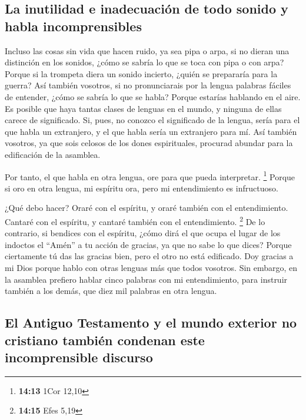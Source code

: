 \hypertarget{la-inutilidad-e-inadecuaciuxf3n-de-todo-sonido-y-habla-incomprensibles}{%
\subsection{La inutilidad e inadecuación de todo sonido y habla
incomprensibles}\label{la-inutilidad-e-inadecuaciuxf3n-de-todo-sonido-y-habla-incomprensibles}}

 Incluso las cosas sin vida que hacen ruido, ya sea pipa o
arpa, si no dieran una distinción en los sonidos, ¿cómo se sabría lo que
se toca con pipa o con arpa?  Porque si la trompeta diera
un sonido incierto, ¿quién se prepararía para la guerra? 
Así también vosotros, si no pronunciarais por la lengua palabras fáciles
de entender, ¿cómo se sabría lo que se habla? Porque estarías hablando
en el aire.  Es posible que haya tantas clases de lenguas
en el mundo, y ninguna de ellas carece de significado. 
Si, pues, no conozco el significado de la lengua, sería para el que
habla un extranjero, y el que habla sería un extranjero para mí.
 Así también vosotros, ya que sois celosos de los dones
espirituales, procurad abundar para la edificación de la asamblea.

 Por tanto, el que habla en otra lengua, ore para que
pueda interpretar. \footnote{\textbf{14:13} 1Cor 12,10} 
Porque si oro en otra lengua, mi espíritu ora, pero mi entendimiento es
infructuoso.

 ¿Qué debo hacer? Oraré con el espíritu, y oraré también
con el entendimiento. Cantaré con el espíritu, y cantaré también con el
entendimiento. \footnote{\textbf{14:15} Efes 5,19}  De lo
contrario, si bendices con el espíritu, ¿cómo dirá el que ocupa el lugar
de los indoctos el ``Amén'' a tu acción de gracias, ya que no sabe lo
que dices?  Porque ciertamente tú das las gracias bien,
pero el otro no está edificado.  Doy gracias a mi Dios
porque hablo con otras lenguas más que todos vosotros. 
Sin embargo, en la asamblea prefiero hablar cinco palabras con mi
entendimiento, para instruir también a los demás, que diez mil palabras
en otra lengua.

\hypertarget{el-antiguo-testamento-y-el-mundo-exterior-no-cristiano-tambiuxe9n-condenan-este-incomprensible-discurso}{%
\subsection{El Antiguo Testamento y el mundo exterior no cristiano
también condenan este incomprensible
discurso}\label{el-antiguo-testamento-y-el-mundo-exterior-no-cristiano-tambiuxe9n-condenan-este-incomprensible-discurso}}

